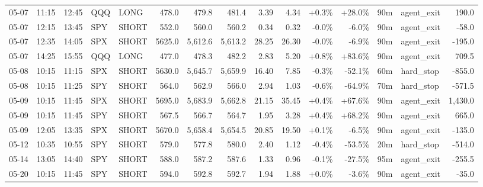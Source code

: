 \documentclass[11pt,a4paper,twoside]{article}
\begin{document}
\begin{landscape}
\begin{center}
\begin{longtable}{>{\color{txtmain}}l l l l l r r r r r r r r >{\color{txtmain}}l r}
05-07 & 11:15 & 12:45 & QQQ & LONG & 478.0 & 479.8 & 481.4 & 3.39 & 4.34 & \textcolor{wingreen}{+0.3\%} & \textcolor{wingreen}{+28.0\%} & 90m & agent\_exit & \textcolor{wingreen}{190.0} \\
05-07 & 12:15 & 13:45 & SPY & SHORT & 552.0 & 560.0 & 560.2 & 0.34 & 0.32 & \textcolor{lossred}{-0.0\%} & \textcolor{lossred}{-6.0\%} & 90m & agent\_exit & \textcolor{lossred}{-58.0} \\
05-07 & 12:35 & 14:05 & SPX & SHORT & 5625.0 & 5,612.6 & 5,613.2 & 28.25 & 26.30 & \textcolor{lossred}{-0.0\%} & \textcolor{lossred}{-6.9\%} & 90m & agent\_exit & \textcolor{lossred}{-195.0} \\
05-07 & 14:25 & 15:55 & QQQ & LONG & 477.0 & 478.3 & 482.2 & 2.83 & 5.20 & \textcolor{wingreen}{+0.8\%} & \textcolor{wingreen}{+83.6\%} & 90m & agent\_exit & \textcolor{wingreen}{709.5} \\
05-08 & 10:15 & 11:15 & SPX & SHORT & 5630.0 & 5,645.7 & 5,659.9 & 16.40 & 7.85 & \textcolor{lossred}{-0.3\%} & \textcolor{lossred}{-52.1\%} & 60m & hard\_stop & \textcolor{lossred}{-855.0} \\
05-08 & 10:15 & 11:25 & SPY & SHORT & 564.0 & 562.9 & 566.0 & 2.94 & 1.03 & \textcolor{lossred}{-0.6\%} & \textcolor{lossred}{-64.9\%} & 70m & hard\_stop & \textcolor{lossred}{-571.5} \\
05-09 & 10:15 & 11:45 & SPX & SHORT & 5695.0 & 5,683.9 & 5,662.8 & 21.15 & 35.45 & \textcolor{wingreen}{+0.4\%} & \textcolor{wingreen}{+67.6\%} & 90m & agent\_exit & \textcolor{wingreen}{1,430.0} \\
05-09 & 10:15 & 11:45 & SPY & SHORT & 567.5 & 566.7 & 564.7 & 1.95 & 3.28 & \textcolor{wingreen}{+0.4\%} & \textcolor{wingreen}{+68.2\%} & 90m & agent\_exit & \textcolor{wingreen}{665.0} \\
05-09 & 12:05 & 13:35 & SPX & SHORT & 5670.0 & 5,658.4 & 5,654.5 & 20.85 & 19.50 & \textcolor{wingreen}{+0.1\%} & \textcolor{lossred}{-6.5\%} & 90m & agent\_exit & \textcolor{lossred}{-135.0} \\
05-12 & 10:35 & 10:55 & SPY & SHORT & 579.0 & 577.8 & 580.0 & 2.40 & 1.12 & \textcolor{lossred}{-0.4\%} & \textcolor{lossred}{-53.5\%} & 20m & hard\_stop & \textcolor{lossred}{-514.0} \\
05-14 & 13:05 & 14:40 & SPY & SHORT & 588.0 & 587.2 & 587.6 & 1.33 & 0.96 & \textcolor{lossred}{-0.1\%} & \textcolor{lossred}{-27.5\%} & 95m & agent\_exit & \textcolor{lossred}{-255.5} \\
05-20 & 10:15 & 11:45 & SPY & SHORT & 594.0 & 592.8 & 592.7 & 1.94 & 1.88 & \textcolor{wingreen}{+0.0\%} & \textcolor{lossred}{-3.6\%} & 90m & agent\_exit & \textcolor{lossred}{-35.0} \\

\end{longtable}
\end{center}
\end{landscape}
\end{document}
